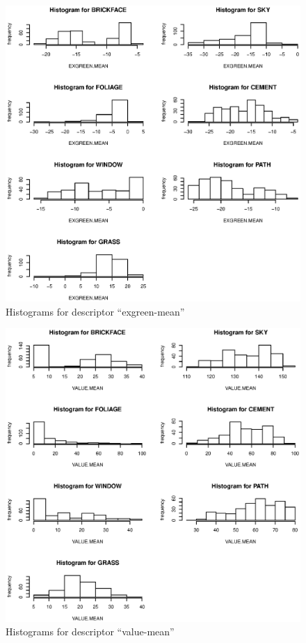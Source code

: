 \documentclass{article}
\begin{document}
\begin{figure}[htp]
\centering
\includegraphics[width=12cm]{a16.eps}
\caption{Histograms for descriptor ``exgreen-mean''}
\end{figure}

\begin{figure}[htp]
\centering
\includegraphics[width=12cm]{a17.eps}
\caption{Histograms for descriptor ``value-mean''}
\end{figure}
\end{document}

